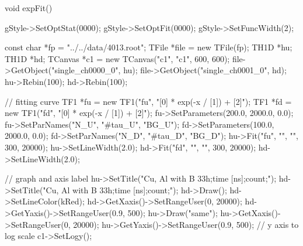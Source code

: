 \documentclass[dvipdfmx]{jsarticle}
\begin{document}
\begin{mylisting}[language=c++,caption=expFit.C]
void expFit()
{
    gStyle->SetOptStat(0000);
    gStyle->SetOptFit(0000);
    gStyle->SetFuncWidth(2);

    const char *fp = "../../data/4013.root";
    TFile *file = new TFile(fp);
    TH1D *hu;
    TH1D *hd;
    TCanvas *c1 = new TCanvas("c1", "c1", 600, 600);
    file->GetObject("single_ch0000_0", hu);
    file->GetObject("single_ch0001_0", hd);
    hu->Rebin(100);
    hd->Rebin(100);

    // fitting curve
    TF1 *fu = new TF1("fu", "[0] * exp(-x / [1]) + [2]");
    TF1 *fd = new TF1("fd", "[0] * exp(-x / [1]) + [2]");
    fu->SetParameters(200.0, 2000.0, 0.0);
    fu->SetParNames("N_U", "#tau_U", "BG_U");
    fd->SetParameters(100.0, 2000.0, 0.0);
    fd->SetParNames("N_D", "#tau_D", "BG_D");
    hu->Fit("fu", "", "", 300, 20000);
    hu->SetLineWidth(2.0);
    hd->Fit("fd", "", "", 300, 20000);
    hd->SetLineWidth(2.0);

    // graph and axis label
    hu->SetTitle("Cu, Al with B 33h;time [ns];count;");
    hd->SetTitle("Cu, Al with B 33h;time [ns];count;");
    hd->Draw();
    hd->SetLineColor(kRed);
    hd->GetXaxis()->SetRangeUser(0, 20000);
    hd->GetYaxis()->SetRangeUser(0.9, 500);
    hu->Draw("same");
    hu->GetXaxis()->SetRangeUser(0, 20000);
    hu->GetYaxis()->SetRangeUser(0.9, 500);
    // y axis to log scale
    c1->SetLogy();
}
\end{mylisting}
\end{document}
